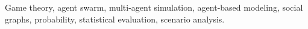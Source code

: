\documentclass[10pt,conference,compsocconf]{IEEEtran}
\newcommand{\rev}[1]{{\color{revisedred}#1}}
\begin{document}
\begin{IEEEkeywords}
Game theory, \rev{agent swarm,} multi-agent simulation, agent-based modeling, social graphs, probability, statistical evaluation, scenario analysis.
\end{IEEEkeywords}










\end{document}
